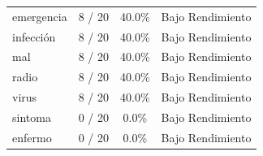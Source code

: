\begin{table}[H]
\begin{tabular}{|l|c|c|l|}
        emergencia & 8 / 20 & 40.0\% & Bajo Rendimiento \\
        infección & 8 / 20 & 40.0\% & Bajo Rendimiento \\
        mal & 8 / 20 & 40.0\% & Bajo Rendimiento \\
        radio & 8 / 20 & 40.0\% & Bajo Rendimiento \\
        virus & 8 / 20 & 40.0\% & Bajo Rendimiento \\
        \hline
        sintoma & 0 / 20 & 0.0\% & Bajo Rendimiento \\
        enfermo & 0 / 20 & 0.0\% & Bajo Rendimiento \\
        \hline
    \end{tabular}
\end{table}